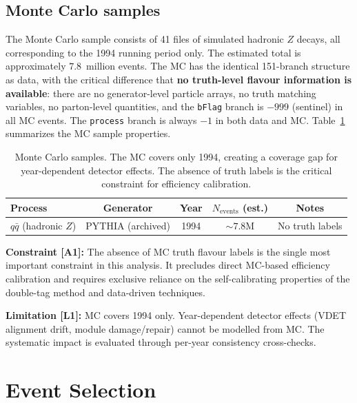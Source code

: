 \documentclass[11pt,a4paper]{article}
\begin{document}
\subsection{Monte Carlo samples}
\label{sec:mc_samples}

The Monte Carlo sample consists of 41 files of simulated hadronic $Z$ decays,
all corresponding to the 1994 running period only. The estimated total is
approximately $7.8$~million events. The MC has the identical 151-branch structure
as data, with the critical difference that \textbf{no truth-level flavour information
is available}: there are no generator-level particle arrays, no truth matching
variables, no parton-level quantities, and the \texttt{bFlag} branch is $-999$
(sentinel) in all MC events. The \texttt{process} branch is always $-1$ in both
data and MC. Table~\ref{tab:mc_samples} summarizes the MC sample properties.

\begin{table}[htbp]
\centering
\caption{Monte Carlo samples. The MC covers only 1994, creating a coverage gap
for year-dependent detector effects. The absence of truth labels is the critical
constraint for efficiency calibration.}
\label{tab:mc_samples}
\begin{tabular}{lcccc}
\toprule
Process & Generator & Year & $N_\mathrm{events}$ (est.) & Notes \\
\midrule
$q\bar{q}$ (hadronic $Z$) & PYTHIA (archived) & 1994 & $\sim 7.8$M & No truth labels \\
\bottomrule
\end{tabular}
\end{table}

\noindent\textbf{Constraint [A1]:} The absence of MC truth flavour labels is the
single most important constraint in this analysis. It precludes direct MC-based
efficiency calibration and requires exclusive reliance on the self-calibrating
properties of the double-tag method and data-driven techniques.

\noindent\textbf{Limitation [L1]:} MC covers 1994 only. Year-dependent detector
effects (VDET alignment drift, module damage/repair) cannot be modelled from MC.
The systematic impact is evaluated through per-year consistency cross-checks.

\FloatBarrier
{}
\section{Event Selection}
\label{sec:selection}
\end{document}

